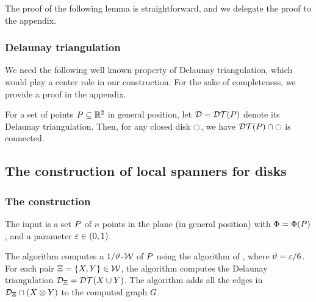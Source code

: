 \documentclass[12pt]{article}%
\begin{document}
The proof of the following lemma is straightforward, and we delegate
the proof to the appendix.
\begin{lemma}
    \LemmaRefineDWBody{}
\end{lemma}



\subsubsection{Delaunay triangulation}

We need the following well known property of Delaunay triangulation,
which would play a center role in our construction. For the sake of
completeness, we provide a proof in the appendix.


\SaveContent{\ClaimDelConnected}%
{%
    For a set of points $P \subseteq \mathbb{R}^2$ in general position, let
    $\DT = \DTX{\PS}$ denote its Delaunay triangulation.  Then, for
    any closed disk $\ocircle$, we have $\restrictY{\DTX{\PS}}{\disk}$ is
    connected.%
}   

\medskip%
\begin{claim}
    \ClaimDelConnected{}
\end{claim}




\subsection{The construction of local spanners for disks}

\subsubsection{The construction}

The input is a set $P$ of $n$ points in the plane (in general
position) with $\spread = \spreadX{\PS}$, and a parameter
$\varepsilon \in (0,1)$.

The algorithm computes a $1/\vartheta$-\WSPD $\mathcal{W}$ of $P$ using the
algorithm of , where $\vartheta = \varepsilon/6$.  For
each pair $\Xi = \{X, Y \} \in \mathcal{W}$, the algorithm computes
the Delaunay triangulation $\DT_{\Pair} = \DTX{ \PSX \cup \PSY}$. The
algorithm adds all the edges in $\mathcal{D}_{\Xi} \cap (X \otimes Y)$
to the computed graph $G$.
\end{document}

